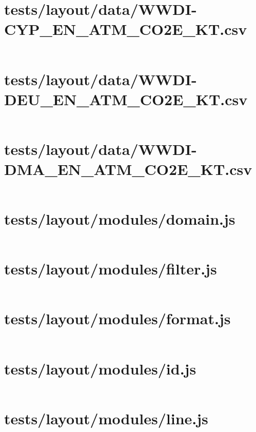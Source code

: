 \documentclass[a4paper]{article}
\begin{document}
\section{tests/layout/data/WWDI-CYP\_EN\_ATM\_CO2E\_KT.csv}
\inputminted[linenos,breaklines,breakbytoken]{text}{tests/layout/data/WWDI-CYP_EN_ATM_CO2E_KT.csv}

\section{tests/layout/data/WWDI-DEU\_EN\_ATM\_CO2E\_KT.csv}
\inputminted[linenos,breaklines,breakbytoken]{text}{tests/layout/data/WWDI-DEU_EN_ATM_CO2E_KT.csv}

\section{tests/layout/data/WWDI-DMA\_EN\_ATM\_CO2E\_KT.csv}
\inputminted[linenos,breaklines,breakbytoken]{text}{tests/layout/data/WWDI-DMA_EN_ATM_CO2E_KT.csv}

\section{tests/layout/modules/domain.js}
\inputminted[linenos,breaklines,breakbytoken]{javascript}{tests/layout/modules/domain.js}

\section{tests/layout/modules/filter.js}
\inputminted[linenos,breaklines,breakbytoken]{javascript}{tests/layout/modules/filter.js}

\section{tests/layout/modules/format.js}
\inputminted[linenos,breaklines,breakbytoken]{javascript}{tests/layout/modules/format.js}

\section{tests/layout/modules/id.js}
\inputminted[linenos,breaklines,breakbytoken]{javascript}{tests/layout/modules/id.js}

\section{tests/layout/modules/line.js}
\inputminted[linenos,breaklines,breakbytoken]{javascript}{tests/layout/modules/line.js}
\end{document}
